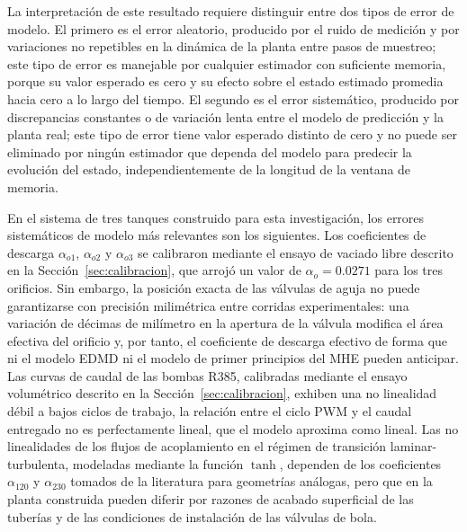 \documentclass[12pt,letterpaper]{article}
\begin{document}
La interpretación de este resultado requiere distinguir entre dos 
tipos de error de modelo. El primero es el error aleatorio, 
producido por el ruido de medición y por variaciones no repetibles 
en la dinámica de la planta entre pasos de muestreo; este tipo 
de error es manejable por cualquier estimador con suficiente 
memoria, porque su valor esperado es cero y su efecto sobre el 
estado estimado promedia hacia cero a lo largo del tiempo. El 
segundo es el error sistemático, producido por discrepancias 
constantes o de variación lenta entre el modelo de predicción y 
la planta real; este tipo de error tiene valor esperado distinto 
de cero y no puede ser eliminado por ningún estimador que dependa 
del modelo para predecir la evolución del estado, independientemente 
de la longitud de la ventana de memoria.

En el sistema de tres tanques construido para esta investigación, 
los errores sistemáticos de modelo más relevantes son los 
siguientes. Los coeficientes de descarga $\alpha_{o1}$, 
$\alpha_{o2}$ y $\alpha_{o3}$ se calibraron mediante el ensayo de 
vaciado libre descrito en la Sección~\ref{sec:calibracion}, que 
arrojó un valor de $\alpha_o = 0.0271$ para los tres orificios. 
Sin embargo, la posición exacta de las válvulas de aguja no puede 
garantizarse con precisión milimétrica entre corridas 
experimentales: una variación de décimas de milímetro en la 
apertura de la válvula modifica el área efectiva del orificio y, 
por tanto, el coeficiente de descarga efectivo de forma que ni 
el modelo EDMD ni el modelo de primer principios del MHE pueden 
anticipar. Las curvas de caudal de las bombas R385, calibradas 
mediante el ensayo volumétrico descrito en la 
Sección~\ref{sec:calibracion}, exhiben una no linealidad débil 
a bajos ciclos de trabajo, la relación entre el ciclo PWM y el
caudal entregado no es perfectamente lineal, que el modelo
aproxima como lineal. Las no linealidades de los flujos de 
acoplamiento en el régimen de transición laminar-turbulenta, 
modeladas mediante la función $\tanh$, dependen de los coeficientes 
$\alpha_{120}$ y $\alpha_{230}$ tomados de la literatura para 
geometrías análogas, pero que en la planta construida pueden 
diferir por razones de acabado superficial de las tuberías y de 
las condiciones de instalación de las válvulas de bola.
\end{document}
